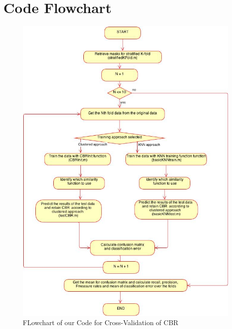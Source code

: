 \documentclass[a4paper,12pt,oneside,final]{report}
\newenvironment{changemargin}[2]{\begin{list}{}{%
\setlength{\topsep}{0pt}%
\setlength{\leftmargin}{0pt}%
\setlength{\rightmargin}{0pt}%
\setlength{\listparindent}{\parindent}%
\setlength{\itemindent}{\parindent}%
\setlength{\parsep}{0pt plus 1pt}%
\addtolength{\leftmargin}{#1}%
\addtolength{\rightmargin}{#2}%
}\item }{\end{list}}
\begin{document}
\section{Code Flowchart}
\begin{figure}[!h]
\begin{changemargin}{-20mm}{-20mm}
\center
\includegraphics[scale=0.3]{Flowchart.jpg}
\caption{FLowchart of our Code for Cross-Validation of CBR}
\end{changemargin}
\end{figure}
\end{document}
